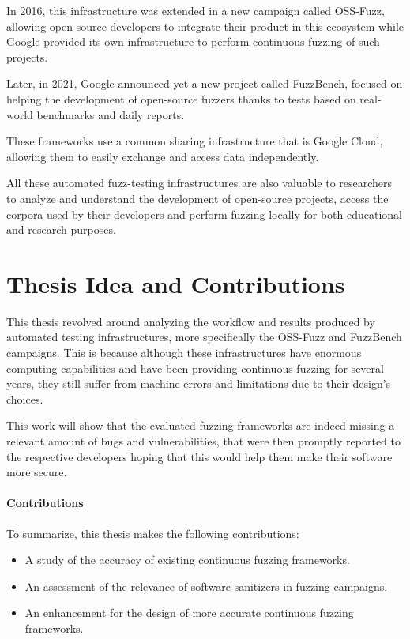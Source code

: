 In 2016, this infrastructure was extended in a new campaign called OSS-Fuzz, allowing open-source developers to integrate their product in this ecosystem while Google provided its own infrastructure to perform continuous fuzzing of such projects.

Later, in 2021, Google announced yet a new project called FuzzBench, focused on helping the development of open-source fuzzers thanks to tests based on real-world benchmarks and daily reports.

These frameworks use a common sharing infrastructure that is Google Cloud, allowing them to easily exchange and access data independently.

All these automated fuzz-testing infrastructures are also valuable to researchers to analyze and understand the development of open-source projects, access the corpora used by their developers and perform fuzzing locally for both educational and research purposes. 




\section{Thesis Idea and Contributions}
This thesis revolved around analyzing the workflow and results produced by automated testing infrastructures, more specifically the OSS-Fuzz and FuzzBench campaigns. This is because although these infrastructures have enormous computing capabilities and have been providing continuous fuzzing for several years, they still suffer from machine errors and limitations due to their design's choices.

This work will show that the evaluated fuzzing frameworks are indeed missing a relevant amount of bugs and vulnerabilities, that were then promptly reported to the respective developers hoping that this would help them make their software more secure. 


\paragraph{Contributions}
To summarize, this thesis makes the following contributions:
\begin{itemize}
    \item A study of the accuracy of existing continuous fuzzing frameworks.
    \item An assessment of the relevance of software sanitizers in fuzzing campaigns.
    \item An enhancement for the design of more accurate continuous fuzzing frameworks.
\end{itemize}



